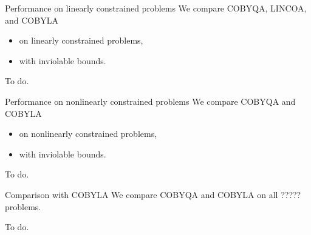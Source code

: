 \documentclass[optimization]{common/talk}
\begin{document}
\begin{frame}{Performance on linearly constrained problems}
    We compare COBYQA, LINCOA, and COBYLA
    \begin{itemize}[<+->]
        \item on \alert{linearly constrained} problems,
        \item with \alert{inviolable} bounds.
    \end{itemize}

    \smallskip

    To do.

\end{frame}

\begin{frame}{Performance on nonlinearly constrained problems}
    We compare COBYQA and COBYLA
    \begin{itemize}[<+->]
        \item on \alert{nonlinearly constrained} problems,
        \item with \alert{inviolable} bounds.
    \end{itemize}

    \smallskip

    To do.

\end{frame}

\begin{frame}{Comparison with COBYLA}
    We compare COBYQA and COBYLA on \alert{all} ????? problems.

    \bigskip

    To do.

\end{frame}
\end{document}
